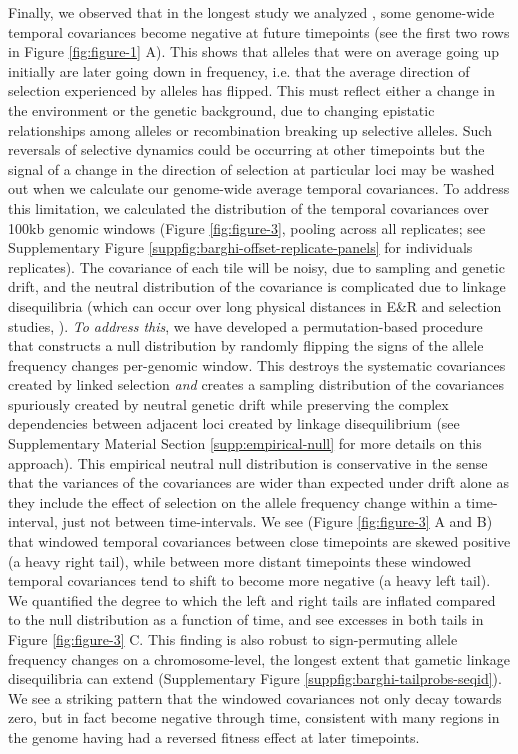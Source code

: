 \documentclass[11pt]{article}
\newcommand{\vb}[1]{{\it \color{blue} #1}}
\newcommand{\vince}[1]{\todo[size=\scriptsize, color=blue!50]{#1}}
\begin{document}
Finally, we observed that in the longest study  we analyzed
\parencite{Barghi2019-qy}, some genome-wide temporal covariances become
negative at future timepoints (see the first two rows in Figure
\ref{fig:figure-1} A). This shows that alleles that were on average going up
initially are later going down in frequency, i.e. that the average direction of
selection experienced by alleles has flipped. This must reflect either a change
in the environment or the genetic background, due to changing epistatic
relationships among alleles or  recombination breaking up selective alleles.
Such reversals of selective dynamics could be occurring at other timepoints but
the signal of a change in the direction of selection at particular loci may be
washed out when we calculate our genome-wide average temporal covariances.  To
address this limitation, we calculated the distribution of the temporal
covariances over 100kb genomic windows (Figure \ref{fig:figure-3}, pooling
across all replicates; see Supplementary Figure
\ref{suppfig:barghi-offset-replicate-panels} for individuals replicates). The
covariance of each tile will be noisy, due to sampling and genetic drift, and
the neutral distribution of the covariance is complicated due to linkage
disequilibria (which can occur over long physical distances in E\&R and
selection studies, \cite{Nuzhdin2013-gf,Baldwin-Brown2014-cl}). \vb{To address
this}, we have developed a permutation-based procedure that constructs a null
distribution by randomly flipping the signs of the   allele frequency changes
per-genomic window. This destroys the systematic covariances created by linked
selection \vb{and} creates a sampling distribution of the covariances
spuriously created by neutral genetic drift while preserving the complex
dependencies between adjacent loci created by linkage disequilibrium (see
Supplementary Material Section \ref{supp:empirical-null} for more details on
this approach).  This empirical neutral null distribution is conservative in
the sense that the variances of the covariances are wider than expected under
drift alone as they include the effect of selection on the allele frequency
change within a time-interval, just not between time-intervals. We see (Figure
\ref{fig:figure-3} A and B) that windowed temporal covariances between close
timepoints are skewed positive (a heavy right tail), while between more distant
timepoints these windowed temporal covariances tend to shift to become more
negative (a heavy left tail).  We quantified the degree to which the left and
right tails are inflated compared to the null distribution as a function of
time, and see excesses in both tails in Figure \ref{fig:figure-3} C. This
finding is also robust to sign-permuting allele frequency changes on a
chromosome-level, the longest extent that gametic linkage disequilibria can
extend \vince{GC: you had ??? here, not sure I see the issue.} (Supplementary
Figure \ref{suppfig:barghi-tailprobs-seqid}). We see a striking pattern that
the windowed covariances not only decay towards zero, but in fact become
negative through time, consistent with many regions in the genome having had a
reversed fitness effect at later timepoints.
\end{document}

